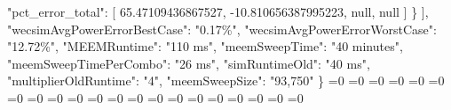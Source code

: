{{          "pct\_error\_total": {[}%
            65.47109436867527, %
            {-}10.810656387995223, %
            null, %
            null%
          {]}%
        \}%
      {]}, %
      "wecsimAvgPowerErrorBestCase": "0.17\%", %
      "wecsimAvgPowerErrorWorstCase": "12.72\%", %
      "MEEMRuntime": "110 ms", %
      "meemSweepTime": "40 minutes", %
      "meemSweepTimePerCombo": "26 ms", %
      "simRuntimeOld": "40 ms", %
      "multiplierOldRuntime": "4", %
      "meemSweepSize": "93,750"%
    \}}%
  \else%
    \ifnum{}=0%
      \def\resultsAOR@out{%
    0.04}%
    \else%
      \ifnum{}=0%
      \def\resultsAOR@out{%
    0.28}%
    \else%
      \ifnum{}=0%
      \def\resultsAOR@out{%
    0.49}%
    \else%
      \ifnum{}=0%
      \def\resultsAOR@out{%
    1.12}%
    \else%
      \ifnum{}=0%
      \def\resultsAOR@out{%
    404.323235}%
    \else%
      \ifnum{}=0%
      \def\resultsAOR@out{%
    3683.159218}%
    \else%
      \ifnum{}=0%
      \def\resultsAOR@out{%
    0.89 \$/kWh}%
    \else%
      \ifnum{}=0%
      \def\resultsAOR@out{%
    10 MN}%
    \else%
      \ifnum{}=0%
      \def\resultsAOR@out{%
    3 MN}%
    \else%
      \ifnum{}=0%
      \def\resultsAOR@out{%
    9 MN}%
    \else%
      \ifnum{}=0%
      \def\resultsAOR@out{%
    2190114.3223833675}%
    \else%
      \ifnum{}=0%
      \def\resultsAOR@out{%
    72822.42633091439}%
    \else%
      \ifnum{}=0%
      \def\resultsAOR@out{%
    152 ms}%
    \else%
      \ifnum{}=0%
      \def\resultsAOR@out{%
    20\%}%
    \else%
      \ifnum{}=0%
      \def\resultsAOR@out{%
    72\%}%
    \else%
      \ifnum{}=0%
      \def\resultsAOR@out{%
    8\%}%
    \else%
      \ifnum{}=0%
      \def\resultsAOR@out{%
    18.0288}%
    \else%
      \ifnum{}=0%
      \def\resultsAOR@out{%
    93750}%
    \else%
      \ifnum{}=0%
      \def\resultsAOR@out{%
    2402.779923}%
    \else%
      \ifnum{}=0%
      \def\resultsAOR@out{%
    6.00 MN}%
    \else%
      \ifnum{}=0%
      \def\resultsAOR@out{%
}}
